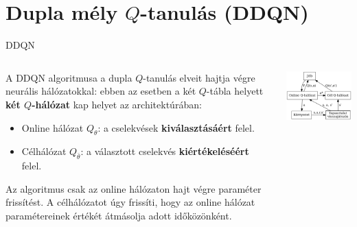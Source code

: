 \documentclass[english, aspectratio=169]{beamer}
\makeatletter
\let\origtableofcontents=\tableofcontents
\def\tableofcontents{\@ifnextchar[{\origtableofcontents}{\gobbletableofcontents}}
\def\gobbletableofcontents#1{\origtableofcontents}
\makeatother
\begin{document}
\section{Dupla mély $Q$-tanulás (DDQN)}

\begin{frame}
\tableofcontents[currentsection]
\end{frame}

\begin{frame}{DDQN}
\begin{columns}
\begin{column}{.5\textwidth}
A DDQN algoritmusa a dupla $Q$-tanulás elveit hajtja végre neurális hálózatokkal: ebben az esetben a két $Q$-tábla helyett \textbf{két $Q$-hálózat} kap helyet az architektúrában:
\begin{itemize}
	\item Online hálózat $Q_\theta$: a cselekvések \textbf{kiválasztásáért} felel.
	\item Célhálózat $Q_{\bar{\theta}}$: a választott cselekvés \textbf{kiértékeléséért} felel.
\end{itemize}
Az algoritmus csak az online hálózaton hajt végre paraméter frissítést. A célhálózatot úgy frissíti, hogy az online hálózat paramétereinek értékét átmásolja adott időközönként. 
\end{column}
\begin{column}{.5\textwidth}
\begin{center}
\includegraphics[width=7cm, keepaspectratio]{graphs/dql_2.png}
\end{center}
\end{column}
\end{columns}
\end{frame}
\end{document}
